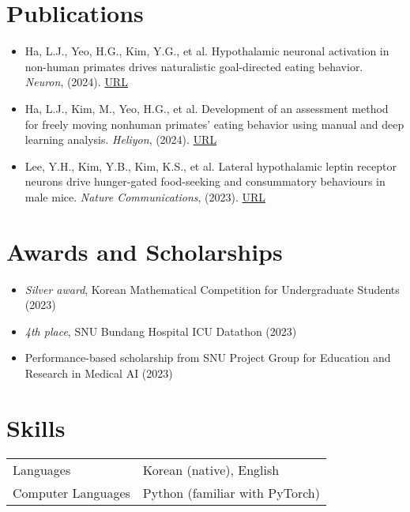 \documentclass[11pt, a4paper]{article}
\begin{document}
\section*{Publications}
\begin{itemize}[leftmargin=*, noitemsep, topsep=0pt, label=$\cdot$]
    \item Ha, L.J., Yeo, H.G., Kim, Y.G., et al. Hypothalamic neuronal activation in non-human primates drives naturalistic goal-directed eating behavior. {\it Neuron}, (2024). \href{https://doi.org/10.1016/j.neuron.2024.03.029}{URL}
    \item Ha, L.J., Kim, M., Yeo, H.G., et al. Development of an assessment method for freely moving nonhuman primates' eating behavior using manual and deep learning analysis. {\it Heliyon}, (2024). \href{https://doi.org/10.1016/j.heliyon.2024.e25561}{URL}
    \item Lee, Y.H., Kim, Y.B., Kim, K.S., et al. Lateral hypothalamic leptin receptor neurons drive hunger-gated food-seeking and consummatory behaviours in male mice. {\it Nature Communications}, (2023). \href{https://doi.org/10.1038/s41467-023-37044-4}{URL} 
\end{itemize}


\section*{Awards and Scholarships}
\begin{itemize}[leftmargin=*, noitemsep, topsep=0pt, label=$\cdot$]
    \item \textit{Silver award}, Korean Mathematical Competition for Undergraduate Students (2023)
    \item \textit{4th place}, SNU Bundang Hospital ICU Datathon (2023)
    \item Performance-based scholarship from SNU Project Group for Education and Research in Medical AI (2023)
\end{itemize}


\section*{Skills}
\begin{tabular}{ll}
    Languages & Korean (native), English \\
    Computer Languages & Python (familiar with PyTorch)
\end{tabular}
\end{document}
